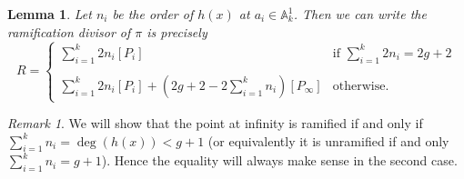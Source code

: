 \documentclass[11pt]{article} %
\newtheorem{lem}{Lemma}
\theoremstyle{remark}\newtheorem*{rem}{Remark}
\begin{document}
\begin{lem}
 Let $n_i$ be the order of $h(x)$ at $a_i\in \mathbb A_k^1$.
Then we can write the ramification divisor of $\pi$ is precisely
 \[
  R = \left\{ \begin{array}{ll}
               \sum_{i=1}^k 2n_i[P_i] & \mbox{if } \sum_{i=1}^k 2n_i = 2g+2 \\
		\\
               \sum_{i=1}^k 2n_i[P_i] + (2g+2-2\sum_{i=1}^kn_i)[P_{\infty}] & \mbox{otherwise.}
             \end{array} \right. \]

\end{lem}
\begin{rem}
 We will show that the point at infinity is ramified if and only if $\sum_{i=1}^k n_i = \deg(h(x)) < g+1$
 (or equivalently it is unramified if and only  $\sum_{i=1}^k n_i = g+1$).
 Hence the equality will always make sense in the second case.
\end{rem}
\end{document}
